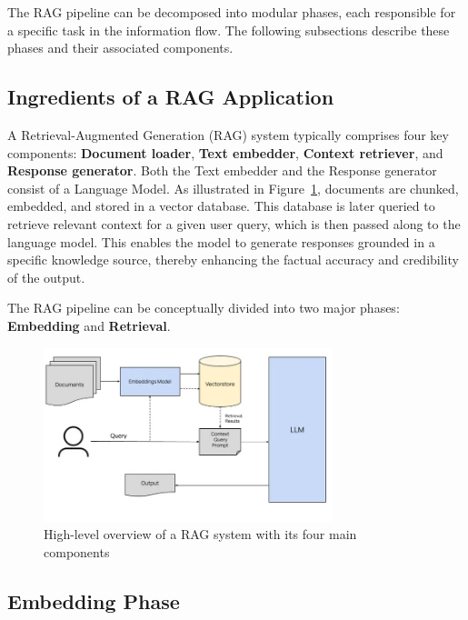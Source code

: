 The RAG pipeline can be decomposed into modular phases, each responsible for a specific task in the information flow. The following subsections describe these phases and their associated components.

\subsection{Ingredients of a RAG Application}
\label{subsec:IngredientsOfRag}

A Retrieval-Augmented Generation (RAG) system typically comprises four key components: \textbf{Document loader}, \textbf{Text embedder}, \textbf{Context retriever}, and \textbf{Response generator}. Both the Text embedder and the Response generator consist of a Language Model. As illustrated in Figure~\ref{fig:rag_overview}, documents are chunked, embedded, and stored in a vector database. This database is later queried to retrieve relevant context for a given user query, which is then passed along to the language model. This enables the model to generate responses grounded in a specific knowledge source, thereby enhancing the factual accuracy and credibility of the output.

The RAG pipeline can be conceptually divided into two major phases: \textbf{Embedding} and \textbf{Retrieval}.
\begin{figure}[h]
    \centering
    \includegraphics[width=0.75\textwidth]{images/RAG-pipeline.jpeg}
    \caption{High-level overview of a RAG system with its four main components~\cite{glenn2024mastering}}
    \label{fig:rag_overview}
\end{figure}

\subsection{Embedding Phase}
\label{subsec:EmbeddingPhase}

